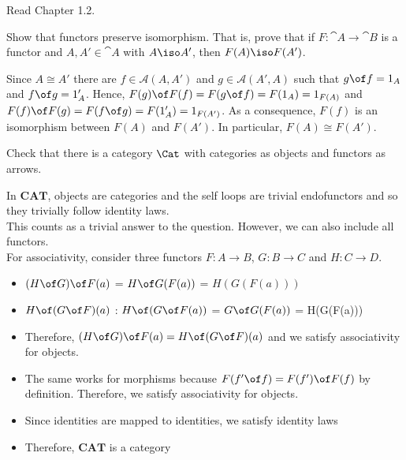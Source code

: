 \def\pathToRoot{../../}

\newcommand{\A}{\cat A}
\newcommand{\B}{\cat B}
\newcommand{\M}{\cat M}
\newcommand{\Rel}{\fcat{Rel}}




\author{Mostafa Ahmed Abdelfattah Abouhamra, Felix Rech, Dominik Wagner}

\begin{hint}
  Read Chapter 1.2.
\end{hint}

\begin{exercise}
Show that functors preserve isomorphism. That is, prove that if $F : \cat{A} \to \cat{B}$ is a functor and $A, A' \in \cat{A}$ with $A \iso A'$, then $F(A) \iso F(A')$.
\end{exercise}

\begin{answer}
  Since $A\cong A'$ there are $f\in\mathscr A(A,A')$ and $g\in\mathscr A(A',A)$ such that $g \of f=1_A$ and $f \of g=1_A'$. Hence, $F(g)\of F(f)=F(g\of f)=F(1_A)=1_{F(A)}$ and $F(f)\of F(g)=F(f\of g)=F(1_A')=1_{F(A')}$. As a consequence, $F(f)$ is an isomorphism between $F(A)$ and $F(A')$. In particular, $F(A)\cong F(A')$.
\end{answer}

\begin{exercise}
  Check that there is a category $\Cat$ with categories as objects and functors as arrows.
\end{exercise}

\begin{answer}
In $\mathbf{CAT}$, objects are categories and the self loops are trivial endofunctors and so they trivially follow identity laws.\\
This counts as a trivial answer to the question. However, we can also include all functors.\\
For associativity, consider three functors $F:A\rightarrow B$, $G:B\rightarrow C$ and $H:C\rightarrow D$.\\
\begin{itemize}
\item $(H \of G) \of F(a)$ = $H \of G(F(a))$ = $H(G(F(a)))$
\item $H \of (G \of F) (a)$ : $H \of (G \of F(a))$ = $G \of G(F(a))$ = H(G(F(a)))
\item Therefore, $(H \of G) \of F(a) = H \of (G \of F) (a)$ and we satisfy associativity for objects.
\item The same works for morphisms because $F(f' \of f)  = F(f') \of F(f)$ by definition. Therefore, we satisfy associativity for objects.
\item Since identities are mapped to identities, we satisfy identity laws
\item Therefore, $\mathbf{CAT}$ is a category
\end{itemize}
\end{answer}

